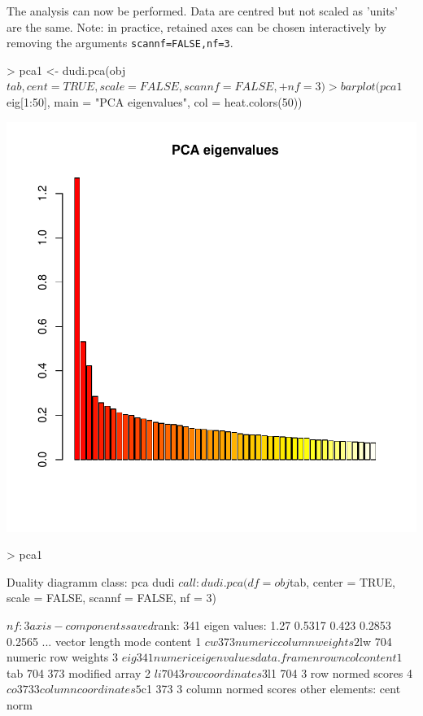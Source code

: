 \documentclass{article}
\begin{document}
The analysis can now be performed.
Data are centred but not scaled as 'units' are the same.
Note: in practice, retained axes can be chosen interactively by removing the arguments \texttt{scannf=FALSE,nf=3}.
\begin{Schunk}
\begin{Sinput}
> pca1 <- dudi.pca(obj$tab, cent = TRUE, scale = FALSE, scannf = FALSE, 
+     nf = 3)
> barplot(pca1$eig[1:50], main = "PCA eigenvalues", col = heat.colors(50))
\end{Sinput}
\end{Schunk}
\includegraphics{figs/base-068}
\begin{Schunk}
\begin{Sinput}
> pca1
\end{Sinput}
\begin{Soutput}
Duality diagramm
class: pca dudi
$call: dudi.pca(df = obj$tab, center = TRUE, scale = FALSE, scannf = FALSE, 
    nf = 3)

$nf: 3 axis-components saved
$rank: 341
eigen values: 1.27 0.5317 0.423 0.2853 0.2565 ...
  vector length mode    content       
1 $cw    373    numeric column weights
2 $lw    704    numeric row weights   
3 $eig   341    numeric eigen values  

  data.frame nrow ncol content             
1 $tab       704  373  modified array      
2 $li        704  3    row coordinates     
3 $l1        704  3    row normed scores   
4 $co        373  3    column coordinates  
5 $c1        373  3    column normed scores
other elements: cent norm 
\end{Soutput}
\end{Schunk}
\end{document}
